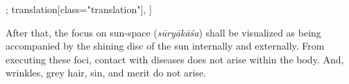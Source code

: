 \begin{alignment}[
  texts=edition[class="edition"];
  translation[class="translation"],
  ]
\begin{edition}
\begin{tlg}[28_1]
\end{tlg}
  \end{edition}
  \begin{translation}
    \begin{tlate}[p28_02]
      After that, the focus on sun-space (\textit{sūryākāśa}) shall be visualized as being accompanied by the shining disc of the sun internally and externally. From executing these foci, contact with diseases does not arise within the body. And, wrinkles, grey hair, sin, and merit do not arise.
    \end{tlate}
    \begin{tlate}[28_1]

\end{tlate}
\end{translation}
\end{alignment}
